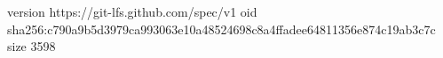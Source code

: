 version https://git-lfs.github.com/spec/v1
oid sha256:c790a9b5d3979ca993063e10a48524698c8a4ffadee64811356e874c19ab3c7c
size 3598
